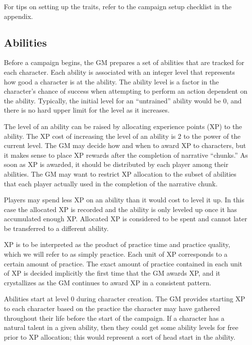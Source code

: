 For tips on setting up the traits, refer to the campaign setup checklist in the appendix.

\subsection{Abilities}
Before a campaign begins, the GM prepares a set of abilities that are tracked for each character.
Each ability is associated with an integer level that represents how good a character is at the ability.
The ability level is a factor in the character’s chance of success when attempting to perform an action dependent on the ability.
Typically, the initial level for an “untrained” ability would be 0, and there is no hard upper limit for the level as it increases.

The level of an ability can be raised by allocating experience points (XP) to the ability.
The XP cost of increasing the level of an ability is 2 to the power of the current level.
The GM may decide how and when to award XP to characters, but it makes sense to place XP rewards after the completion of narrative ``chunks.''
As soon as XP is awarded, it should be distributed by each player among their abilities.
The GM may want to restrict XP allocation to the subset of abilities that each player actually used in the completion of the narrative chunk.

Players may spend less XP on an ability than it would cost to level it up.
In this case the allocated XP is recorded and the ability is only leveled up once it has accumulated enough XP.
Allocated XP is considered to be spent and cannot later be transferred to a different ability.

XP is to be interpreted as the product of practice time and practice quality, which we will refer to as simply practice.
Each unit of XP corresponds to a certain amount of practice.
The exact amount of practice contained in each unit of XP is decided implicitly the first time that the GM awards XP,
and it crystallizes as the GM continues to award XP in a consistent pattern.

Abilities start at level 0 during character creation.
The GM provides starting XP to each character based on the practice the character may have gathered throughout their life before the start of the campaign.
If a character has a natural talent in a given ability,
then they could get some ability levels for free prior to XP allocation; this would represent a sort of head start in the ability.

